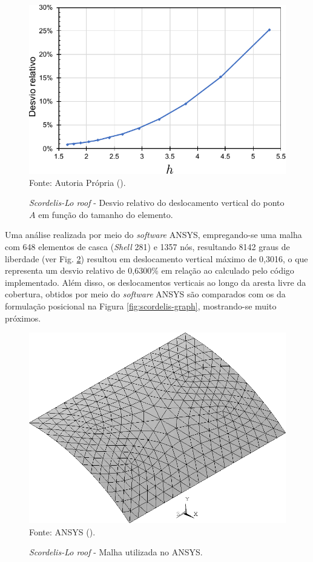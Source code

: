 \begin{figure}[h!]
    \centering
    \caption{\textit{Scordelis-Lo roof} - Desvio relativo do deslocamento vertical do ponto $A$ em função do tamanho do elemento.}
    \includegraphics[width=0.6\linewidth]{Figuras/scordelis/static-sol.pdf}
    \\Fonte: Autoria Própria (\the\year).
    \label{fig:shell-static-sol}
\end{figure}

Uma análise realizada por meio do \textit{software} ANSYS, empregando-se uma malha com 648 elementos de casca (\textit{Shell} 281) e 1357 nós, resultando 8142 graus de liberdade (ver Fig. \ref{fig:scordelisANSYS}) resultou em deslocamento vertical máximo de 0,3016, o que representa um desvio relativo de 0,6300\% em relação ao calculado pelo código implementado. Além disso, os deslocamentos verticais ao longo da aresta livre da cobertura, obtidos por meio do \textit{software} ANSYS são comparados com os da formulação posicional na Figura \ref{fig:scordelis-graph}, mostrando-se muito próximos.

\begin{figure}[h!]
    \centering
    \caption{\textit{Scordelis-Lo roof} - Malha utilizada no ANSYS.}
    \includegraphics[width=0.45\linewidth]{Figuras/scordelis/ANSYS.png}
    \\Fonte: ANSYS (\the\year).
    \label{fig:scordelisANSYS}
\end{figure}


